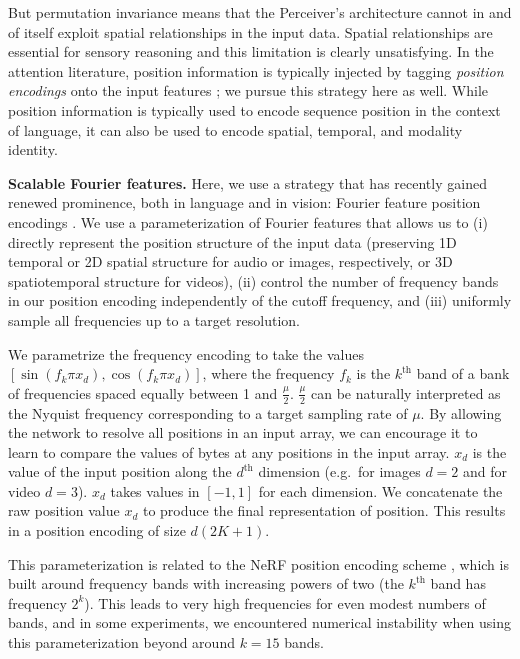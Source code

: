 But permutation invariance means that the Perceiver's architecture cannot in and of itself exploit spatial relationships in the input data. Spatial relationships are essential for sensory reasoning \cite{kant1781critique} and this limitation is clearly unsatisfying. In the attention literature, position information is typically injected by tagging \textit{position encodings} onto the input features \cite{vaswani2017attention}; we pursue this strategy here as well. While position information is typically used to encode sequence position in the context of language, it can also be used to encode spatial, temporal, and modality identity.

 \textbf{Scalable Fourier features.} Here, we use a strategy that has recently gained renewed prominence, both in language and in vision: Fourier feature position encodings \cite{stanley2007compositional, vaswani2017attention, parmar2018image, tancik2020fourier, mildenhall2020nerf}. We use a parameterization of Fourier features that allows us to (i) directly represent the position structure of the input data (preserving 1D temporal or 2D spatial structure for audio or images, respectively, or 3D spatiotemporal structure for videos), (ii) control the number of frequency bands in our position encoding independently of the cutoff frequency, and (iii) uniformly sample all frequencies up to a target resolution. 

We parametrize the frequency encoding to take the values $[\sin(f_k \pi x_d), \cos(f_k \pi x_d)]$, where the frequency $f_k$ is the $k^{\text{th}}$ band of a bank of frequencies spaced equally between 1 and $\frac{\mu}{2}$. $\frac{\mu}{2}$ can be naturally interpreted as the Nyquist frequency \citep{nyquist1928certain} corresponding to a target sampling rate of $\mu$. By allowing the network to resolve all positions in an input array, we can encourage it to learn to compare the values of bytes at any positions in the input array. $x_d$ is the value of the input position along the $d^{\text{th}}$ dimension (e.g.\ for images $d=2$ and for video $d=3$). $x_d$ takes values in $[-1, 1]$ for each dimension. We concatenate the raw position value $x_d$ to produce the final representation of position. This results in a position encoding of size $d(2K + 1)$.

This parameterization is related to the NeRF position encoding scheme \cite{mildenhall2020nerf}, which is built around frequency bands with increasing powers of two (the $k^{\text{th}}$ band has frequency $2^k$). This leads to very high frequencies for even modest numbers of bands, and in some experiments, we encountered numerical instability when using this parameterization beyond around $k=15$ bands. 

